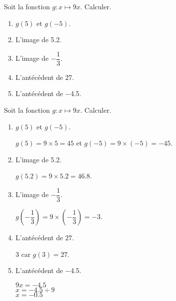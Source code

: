 \begin{exercice}
    Soit la fonction $g:x\longmapsto 9x$. Calculer.
    \begin{enumerate}
        \item $g(5)$ et $g(-5)$.
        \item L'image de \num{5.2}.
        \item L'image de $-\dfrac{1}{3}$.
        \item L'antécédent de $27$.
        \item L'antécédent de \num{-4.5}.
    \end{enumerate}
\end{exercice}
\begin{corrige}
    Soit la fonction $g:x\longmapsto 9x$. Calculer.

    \begin{enumerate}
        \item $g(5)$ et $g(-5)$.
        
        {\red $g(5)=9\times 5 = 45$ et $g(-5)=9\times (-5)=-45$.}
        \item L'image de \num{5.2}.
        
        {\red $g(\num{5.2})= 9\times \num{5.2} = \num{46.8}$.}
        \item L'image de $-\dfrac{1}{3}$.
        
        {\red $g(-\dfrac{1}{3})= 9\times \left(-\dfrac{1}{3}\right) = -3$.}
        \item L'antécédent de $27$.
        
        {\red $3$ car $g(3)= 27$.}
        \item L'antécédent de \num{-4.5}.
        
        {\red $9x=\num{-4.5}$\\ $x=\num{-4.5}\div 9$\\ $x=\num{-0.5}$}
    \end{enumerate}
\end{corrige}
